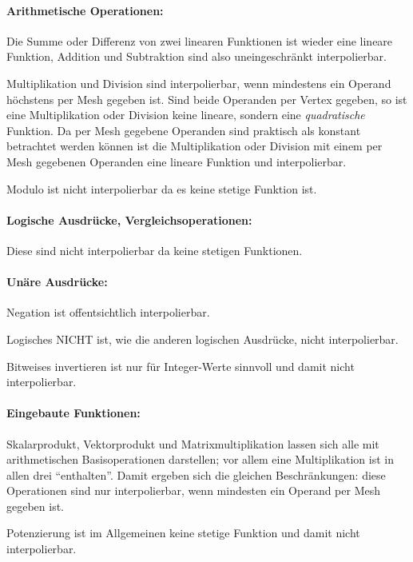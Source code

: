 \documentclass[twoside,a4paper,fleqn,12pt]{article}
\begin{document}

\paragraph{Arithmetische Operationen:} Die Summe oder Differenz von zwei linearen Funktionen
ist wieder eine lineare Funktion, Addition und Subtraktion sind also uneingeschränkt interpolierbar.

Multiplikation und Division sind interpolierbar, wenn mindestens ein Operand höchstens per Mesh gegeben ist.
Sind beide Operanden per Vertex gegeben, so ist eine Multiplikation oder Division keine lineare,
sondern eine \emph{quadratische} Funktion. Da per Mesh gegebene Operanden sind praktisch als
konstant betrachtet werden können ist die Multiplikation oder Division mit einem per Mesh gegebenen
Operanden eine lineare Funktion und interpolierbar.

Modulo ist nicht interpolierbar da es keine stetige Funktion ist.

\paragraph{Logische Ausdrücke, Vergleichsoperationen:} Diese sind nicht interpolierbar da keine stetigen Funktionen.

\paragraph{Unäre Ausdrücke:} Negation ist offentsichtlich interpolierbar.

Logisches NICHT ist, wie die anderen logischen Ausdrücke, nicht interpolierbar.

Bitweises invertieren ist nur für Integer-Werte sinnvoll und damit nicht interpolierbar.

\paragraph{Eingebaute Funktionen:} \label{split_builtins}
Skalarprodukt, Vektorprodukt und Matrixmultiplikation lassen sich alle mit arithmetischen Basisoperationen darstellen;
vor allem eine Multiplikation ist in allen drei "`enthalten"'. Damit ergeben sich die gleichen Beschränkungen:
diese Operationen sind nur interpolierbar, wenn mindesten ein Operand per Mesh gegeben ist.

Potenzierung ist im Allgemeinen keine stetige Funktion und damit nicht interpolierbar.
\end{document}
